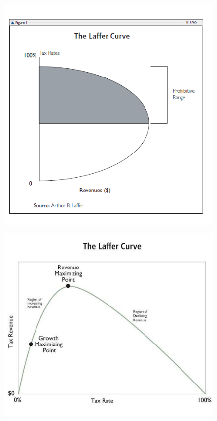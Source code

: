 \documentclass[a4paper,12pt]{article}[abntex2]
\begin{document}
\begin{figure}[H]
    \centering
    \includegraphics[width=0.7\linewidth]{Imagens/a18i13.png}
\end{figure}

\begin{figure}[H]
    \centering
    \includegraphics[width=0.7\linewidth]{Imagens/a18i14.png}
\end{figure}
\end{document}
